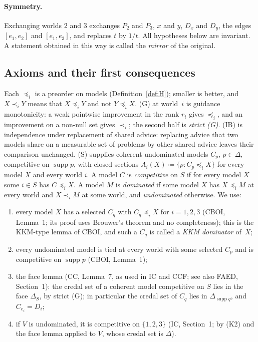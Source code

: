 \documentclass[11pt]{article}
\theoremstyle{definition}\newtheorem{definition}[theorem]{Definition}
\theoremstyle{remark}\newtheorem{remark}[theorem]{Remark}
\newcommand{\supp}{\operatorname{supp}}
\begin{document}
\paragraph{Symmetry.} Exchanging worlds $2$ and $3$ exchanges $P_2$ and
$P_3$, $x$ and $y$, $D_x$ and $D_y$, the edges $[e_1,e_2]$ and $[e_1,e_3]$,
and replaces $t$ by $1/t$. All hypotheses below are invariant. A statement
obtained in this way is called the \emph{mirror} of the original.

\subsection{Axioms and their first consequences}

Each $\preceq_i$ is a preorder on models (Definition~\ref{def:H});
smaller is better, and $X\prec_iY$ means that $X\preceq_iY$ and not
$Y\preceq_iX$. (G) at world~$i$ is guidance monotonicity: a weak pointwise
improvement in the rank $r_i$ gives $\preceq_i$, and an improvement on a
non-null set gives $\prec_i$; the second half is \emph{strict (G)}. (IB) is
independence under replacement of shared advice: replacing advice that
two models share on a measurable set of problems by other shared advice
leaves their comparison unchanged. (S) supplies coherent undominated models $C_p$,
$p\in\Delta$, competitive on $\supp p$, with closed sections
$A_i(X)\coloneqq\{p:C_p\preceq_iX\}$ for every model $X$ and every world $i$.
A model $C$ is \emph{competitive} on $S$ if for every model $X$ some $i\in S$
has $C\preceq_iX$. A model $M$ is \emph{dominated} if some model $X$ has
$X\preceq_iM$ at every world and $X\prec_iM$ at some world, and
\emph{undominated} otherwise. We use:
\begin{enumerate}[label=(K\arabic*),leftmargin=*,itemsep=2pt]
\item every model $X$ has a selected $C_q$ with $C_q\preceq_iX$ for
$i=1,2,3$ (CBOI, Lemma~1; its proof uses Brouwer's theorem and no
completeness); this is the KKM-type lemma of CBOI, and such a $C_q$ is
called a \emph{KKM dominator} of~$X$;
\item every undominated model is tied at every world with some selected
$C_p$ and is competitive on $\supp p$ (CBOI, Lemma~1);
\item the face lemma (CC, Lemma~7, as used in IC and CCF; see also FAED,
Section~1): the credal set of a coherent model competitive on $S$ lies in the
face $\Delta_S$, by strict (G); in particular the credal set of $C_q$ lies in
$\Delta_{\supp q}$, and $C_{e_i}=D_i$;
\item if $V$ is undominated, it is competitive on $\{1,2,3\}$ (IC,
Section~1; by (K2) and the face lemma applied to $V$, whose credal set is
$\Delta$).
\end{enumerate}
\end{document}
